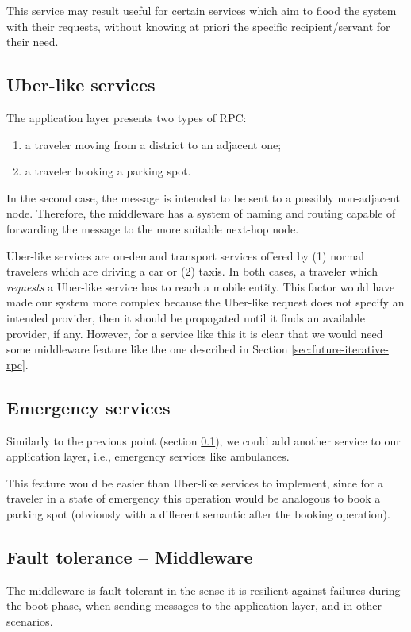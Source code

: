 This service may result useful for certain services which aim to flood the
system with their requests, without knowing at priori the specific
recipient/servant for their need.

\subsection{Uber-like services}\label{sec:future-uber}
The application layer presents two types of RPC:

\begin{enumerate}
  \item a traveler moving from a district to an adjacent one;
  \item a traveler booking a parking spot.
\end{enumerate}

In the second case, the message is intended to be sent to a possibly
non-adjacent node. Therefore, the middleware has a system of naming and routing
capable of forwarding the message to the more suitable next-hop node.

Uber-like services are on-demand transport services offered by (1) normal
travelers which are driving a car or (2) taxis. In both cases, a traveler
which \textit{requests} a Uber-like service has to reach a mobile entity.
This factor would have made our system more complex because the Uber-like
request does not specify an intended provider, then it should be propagated
until it finds an available provider, if any.
However, for a service like this it is clear that we would need some middleware
feature like the one described in Section \ref{sec:future-iterative-rpc}.

\subsection{Emergency services}
Similarly to the previous point (section \ref{sec:future-uber}), we could add
another service to our application layer, i.e., emergency services like
ambulances.

This feature would be easier than Uber-like services to implement, since for a
traveler in a state of emergency this operation would be analogous to book a
parking spot (obviously with a different semantic after the booking operation).

\subsection{Fault tolerance -- Middleware}
The middleware is fault tolerant in the sense it is resilient against failures
during the boot phase, when sending messages to the application layer, and in
other scenarios.

